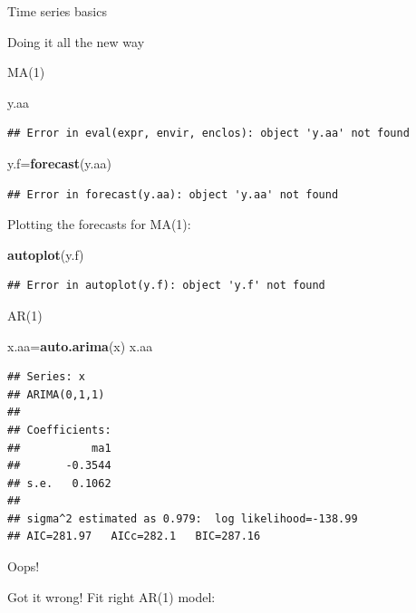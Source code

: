 \documentclass[ignorenonframetext,]{beamer}
\newenvironment{Shaded}{\begin{snugshade}}{\end{snugshade}}
\newcommand{\KeywordTok}[1]{\textcolor[rgb]{0.13,0.29,0.53}{\textbf{#1}}}
\newcommand{\NormalTok}[1]{#1}
\begin{document}
\begin{frame}[fragile]{Time series basics}
\begin{block}{Doing it all the new way}
\begin{block}{MA(1)}
\begin{Shaded}
\begin{Highlighting}[]
\NormalTok{y.aa}
\end{Highlighting}
\end{Shaded}

\begin{verbatim}
## Error in eval(expr, envir, enclos): object 'y.aa' not found
\end{verbatim}

\begin{Shaded}
\begin{Highlighting}[]
\NormalTok{y.f=}\KeywordTok{forecast}\NormalTok{(y.aa)}
\end{Highlighting}
\end{Shaded}

\begin{verbatim}
## Error in forecast(y.aa): object 'y.aa' not found
\end{verbatim}

Plotting the forecasts for MA(1):

\begin{Shaded}
\begin{Highlighting}[]
\KeywordTok{autoplot}\NormalTok{(y.f)}
\end{Highlighting}
\end{Shaded}

\begin{verbatim}
## Error in autoplot(y.f): object 'y.f' not found
\end{verbatim}

\end{block}

\begin{block}{AR(1)}

\begin{Shaded}
\begin{Highlighting}[]
\NormalTok{x.aa=}\KeywordTok{auto.arima}\NormalTok{(x)}
\NormalTok{x.aa}
\end{Highlighting}
\end{Shaded}

\begin{verbatim}
## Series: x 
## ARIMA(0,1,1) 
## 
## Coefficients:
##           ma1
##       -0.3544
## s.e.   0.1062
## 
## sigma^2 estimated as 0.979:  log likelihood=-138.99
## AIC=281.97   AICc=282.1   BIC=287.16
\end{verbatim}

Oops!

Got it wrong! Fit right AR(1) model:


\end{block}
\end{block}
\end{frame}
\end{document}
